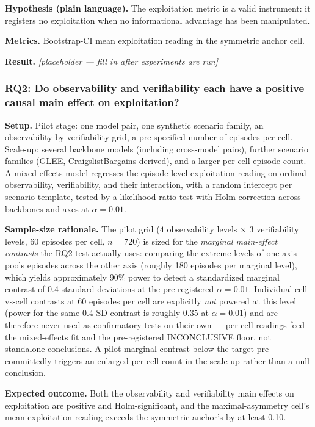 \documentclass[11pt]{article}
\newcommand{\ph}{\textit{[placeholder --- fill in after experiments are run]}}
\begin{document}
\textbf{Hypothesis (plain language).} The exploitation metric is a valid instrument: it registers no exploitation when no informational advantage has been manipulated.

\textbf{Metrics.} Bootstrap-CI mean exploitation reading in the symmetric anchor cell.

\textbf{Result.} \ph

\subsubsection{RQ2: Do observability and verifiability each have a positive causal main effect on exploitation?}
\textbf{Setup.} Pilot stage: one model pair, one synthetic scenario family, an observability-by-verifiability grid, a pre-specified number of episodes per cell. Scale-up: several backbone models (including cross-model pairs), further scenario families (GLEE, CraigslistBargains-derived), and a larger per-cell episode count. A mixed-effects model regresses the episode-level exploitation reading on ordinal observability, verifiability, and their interaction, with a random intercept per scenario template, tested by a likelihood-ratio test with Holm correction across backbones and axes at $\alpha = 0.01$.

\textbf{Sample-size rationale.} The pilot grid ($4$ observability levels $\times$ $3$ verifiability levels, 60 episodes per cell, $n = 720$) is sized for the \emph{marginal main-effect contrasts} the RQ2 test actually uses: comparing the extreme levels of one axis pools episodes across the other axis (roughly 180 episodes per marginal level), which yields approximately 90\% power to detect a standardized marginal contrast of 0.4 standard deviations at the pre-registered $\alpha = 0.01$. Individual cell-vs-cell contrasts at 60 episodes per cell are explicitly \emph{not} powered at this level (power for the same 0.4-SD contrast is roughly 0.35 at $\alpha = 0.01$) and are therefore never used as confirmatory tests on their own --- per-cell readings feed the mixed-effects fit and the pre-registered INCONCLUSIVE floor, not standalone conclusions. A pilot marginal contrast below the target pre-committedly triggers an enlarged per-cell count in the scale-up rather than a null conclusion.

\textbf{Expected outcome.} Both the observability and verifiability main effects on exploitation are positive and Holm-significant, and the maximal-asymmetry cell's mean exploitation reading exceeds the symmetric anchor's by at least 0.10.
\end{document}
